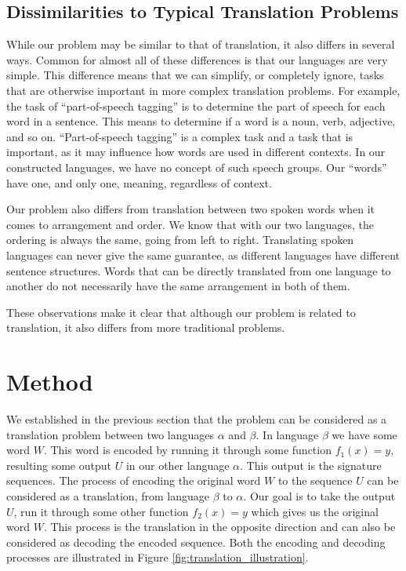 \subsection{Dissimilarities to Typical Translation Problems}
While our problem may be similar to that of translation, it also differs in several ways. Common for almost all of these differences is that our languages are very simple. This difference means that we can simplify, or completely ignore, tasks that are otherwise important in more complex translation problems. For example, the task of ``part-of-speech tagging'' is to determine the part of speech for each word in a sentence. This means to determine if a word is a noun, verb, adjective, and so on. ``Part-of-speech tagging'' is a complex task and a task that is important, as it may influence how words are used in different contexts. In our constructed languages, we have no concept of such speech groups. Our ``words'' have one, and only one, meaning, regardless of context. 

Our problem also differs from translation between two spoken words when it comes to arrangement and order. We know that with our two languages, the ordering is always the same, going from left to right. Translating spoken languages can never give the same guarantee, as different languages have different sentence structures. Words that can be directly translated from one language to another do not necessarily have the same arrangement in both of them.

These observations make it clear that although our problem is related to translation, it also differs from more traditional problems. 


\section{Method}
\label{sec:method}
We established in the previous section that the problem can be considered as a translation problem between two languages \(\alpha\) and \(\beta\). In language \(\beta\) we have some word \(W\). This word is encoded by running it through some function \(f_{1}(x) = y\), resulting some output \(U\) in our other language \(\alpha\). This output is the signature sequences. The process of encoding the original word \(W\) to the sequence \(U\) can be considered as a translation, from language \(\beta\) to \(\alpha\). Our goal is to take the output \(U\), run it through some other function \(f_{2}(x) = y\) which gives us the original word \(W\). This process is the translation in the opposite direction and can also be considered as decoding the encoded sequence. Both the encoding and decoding processes are illustrated in Figure \ref{fig:translation_illustration}.

